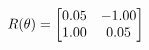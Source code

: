 \documentclass[preview]{standalone}
\begin{document}
\begin{align*}
\special{dvisvgm:raw <g id='unique000'>}R(\theta) = \begin{bmatrix}0.05 & -1.00\\1.00 & 0.05\end{bmatrix}\special{dvisvgm:raw </g>}
\end{align*}
\end{document}
